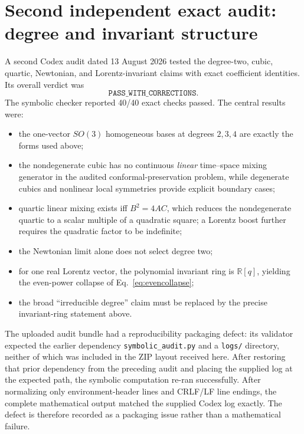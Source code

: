 \documentclass[11pt,a4paper]{article}
\begin{document}
\section{Second independent exact audit: degree and invariant structure}
A second Codex audit dated 13 August 2026 tested the degree-two, cubic, quartic, Newtonian, and Lorentz-invariant claims with exact coefficient identities.  Its overall verdict was
\begin{equation}
\boxed{\texttt{PASS\_WITH\_CORRECTIONS}}.
\end{equation}
The symbolic checker reported 40/40 exact checks passed.  The central results were:
\begin{itemize}
\item the one-vector $SO(3)$ homogeneous bases at degrees $2,3,4$ are exactly the forms used above;
\item the nondegenerate cubic has no continuous \emph{linear} time--space mixing generator in the audited conformal-preservation problem, while degenerate cubics and nonlinear local symmetries provide explicit boundary cases;
\item quartic linear mixing exists iff $B^2=4AC$, which reduces the nondegenerate quartic to a scalar multiple of a quadratic square; a Lorentz boost further requires the quadratic factor to be indefinite;
\item the Newtonian limit alone does not select degree two;
\item for one real Lorentz vector, the polynomial invariant ring is $\mathbb R[q]$, yielding the even-power collapse of Eq.~\eqref{eq:evencollapse};
\item the broad ``irreducible degree'' claim must be replaced by the precise invariant-ring statement above.
\end{itemize}

The uploaded audit bundle had a reproducibility packaging defect: its validator expected the earlier dependency \texttt{symbolic\_audit.py} and a \texttt{logs/} directory, neither of which was included in the ZIP layout received here.  After restoring that prior dependency from the preceding audit and placing the supplied log at the expected path, the symbolic computation re-ran successfully.  After normalizing only environment-header lines and CRLF/LF line endings, the complete mathematical output matched the supplied Codex log exactly.  The defect is therefore recorded as a packaging issue rather than a mathematical failure.
\end{document}
